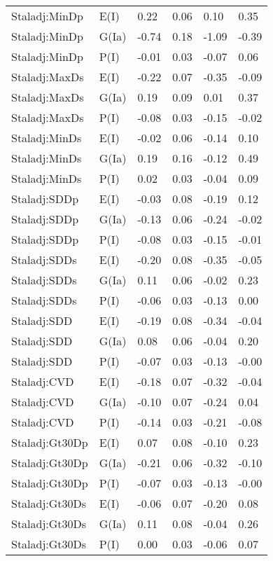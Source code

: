 \begin{center}
\begin{longtable}{|p{1.1in}|p{0.7in}|p{0.7in}|p{0.6in}|p{0.6in}|p{0.6in}|}
  Staladj:MinDp & E(I) & 0.22 & 0.06 & 0.10 & 0.35 \\ 
  Staladj:MinDp & G(Ia) & -0.74 & 0.18 & -1.09 & -0.39 \\ 
  Staladj:MinDp & P(I) & -0.01 & 0.03 & -0.07 & 0.06 \\ 
  Staladj:MaxDs & E(I) & -0.22 & 0.07 & -0.35 & -0.09 \\ 
  Staladj:MaxDs & G(Ia) & 0.19 & 0.09 & 0.01 & 0.37 \\ 
  Staladj:MaxDs & P(I) & -0.08 & 0.03 & -0.15 & -0.02 \\ 
  Staladj:MinDs & E(I) & -0.02 & 0.06 & -0.14 & 0.10 \\ 
  Staladj:MinDs & G(Ia) & 0.19 & 0.16 & -0.12 & 0.49 \\ 
  Staladj:MinDs & P(I) & 0.02 & 0.03 & -0.04 & 0.09 \\ 
  Staladj:SDDp & E(I) & -0.03 & 0.08 & -0.19 & 0.12 \\ 
  Staladj:SDDp & G(Ia) & -0.13 & 0.06 & -0.24 & -0.02 \\ 
  Staladj:SDDp & P(I) & -0.08 & 0.03 & -0.15 & -0.01 \\ 
  Staladj:SDDs & E(I) & -0.20 & 0.08 & -0.35 & -0.05 \\ 
  Staladj:SDDs & G(Ia) & 0.11 & 0.06 & -0.02 & 0.23 \\ 
  Staladj:SDDs & P(I) & -0.06 & 0.03 & -0.13 & 0.00 \\ 
  Staladj:SDD & E(I) & -0.19 & 0.08 & -0.34 & -0.04 \\ 
  Staladj:SDD & G(Ia) & 0.08 & 0.06 & -0.04 & 0.20 \\ 
  Staladj:SDD & P(I) & -0.07 & 0.03 & -0.13 & -0.00 \\ 
  Staladj:CVD & E(I) & -0.18 & 0.07 & -0.32 & -0.04 \\ 
  Staladj:CVD & G(Ia) & -0.10 & 0.07 & -0.24 & 0.04 \\ 
  Staladj:CVD & P(I) & -0.14 & 0.03 & -0.21 & -0.08 \\ 
  Staladj:Gt30Dp & E(I) & 0.07 & 0.08 & -0.10 & 0.23 \\ 
  Staladj:Gt30Dp & G(Ia) & -0.21 & 0.06 & -0.32 & -0.10 \\ 
  Staladj:Gt30Dp & P(I) & -0.07 & 0.03 & -0.13 & -0.00 \\ 
  Staladj:Gt30Ds & E(I) & -0.06 & 0.07 & -0.20 & 0.08 \\ 
  Staladj:Gt30Ds & G(Ia) & 0.11 & 0.08 & -0.04 & 0.26 \\ 
  Staladj:Gt30Ds & P(I) & 0.00 & 0.03 & -0.06 & 0.07 \\ 

\end{longtable}
\end{center}
